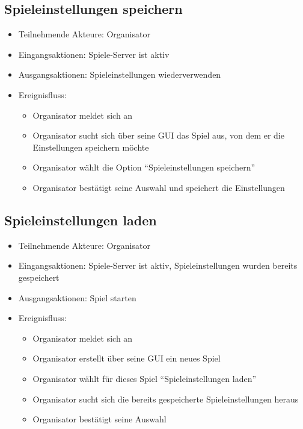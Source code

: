 \documentclass[a4paper]{scrreprt}
\begin{document}
    \subsection{Spieleinstellungen speichern}
    \begin{itemize}
        \item Teilnehmende Akteure: \Gls{Organisator}
        \item Eingangsaktionen: Spiele-Server ist aktiv
        \item Ausgangsaktionen: \Gls{Spieleinstellungen} wiederverwenden
        \item Ereignisfluss:
        \begin{itemize}
            \item \Gls{Organisator} meldet sich an
            \item \Gls{Organisator} sucht sich über seine GUI das Spiel aus, von dem er die Einstellungen speichern möchte
            \item \Gls{Organisator} wählt die Option \enquote{Spieleinstellungen speichern}
            \item \Gls{Organisator} bestätigt seine Auswahl und speichert die Einstellungen
        \end{itemize}
    \end{itemize}

    \subsection{Spieleinstellungen laden}
    \begin{itemize}
        \item Teilnehmende Akteure: \Gls{Organisator}
        \item Eingangsaktionen: Spiele-Server ist aktiv, \Gls{Spieleinstellungen} wurden bereits gespeichert
        \item Ausgangsaktionen: Spiel starten
        \item Ereignisfluss:
        \begin{itemize}
            \item \Gls{Organisator} meldet sich an
            \item \Gls{Organisator} erstellt über seine GUI ein neues Spiel
            \item \Gls{Organisator} wählt für dieses Spiel \enquote{Spieleinstellungen laden}
            \item \Gls{Organisator} sucht sich die bereits gespeicherte \Gls{Spieleinstellungen} heraus
            \item \Gls{Organisator} bestätigt seine Auswahl
        \end{itemize}
    \end{itemize}
\end{document}
